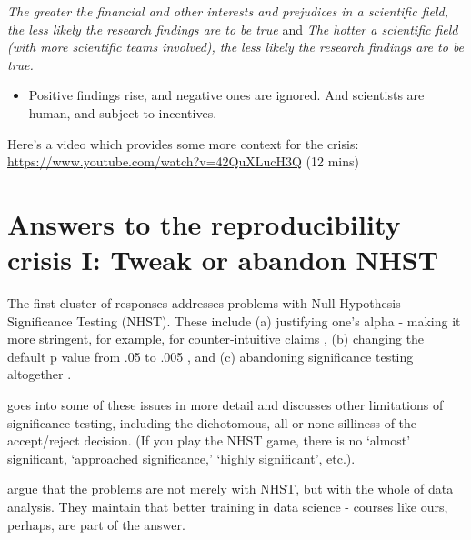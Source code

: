 \documentclass[
  openany]{book}
\providecommand{\tightlist}{%
  \setlength{\itemsep}{0pt}\setlength{\parskip}{0pt}}
\begin{document}
\emph{The greater the financial and other interests and prejudices in a scientific field, the less likely the research findings are to be true} and \emph{The hotter a scientific field (with more scientific teams involved), the less likely the research findings are to be true.}

\begin{itemize}
\tightlist
\item
  Positive findings rise, and negative ones are ignored. And scientists are human, and subject to incentives.
\end{itemize}

Here's a video which provides some more context for the crisis: \url{https://www.youtube.com/watch?v=42QuXLucH3Q} (12 mins)

\hypertarget{answers-to-the-reproducibility-crisis-i-tweak-or-abandon-nhst}{%
\section{Answers to the reproducibility crisis I: Tweak or abandon NHST}\label{answers-to-the-reproducibility-crisis-i-tweak-or-abandon-nhst}}

The first cluster of responses addresses problems with Null Hypothesis Significance Testing (NHST). These include (a) justifying one's alpha - making it more stringent, for example, for counter-intuitive claims \citep{grange2018justify}, (b) changing the default p value from .05 to .005 \citep{benjamin2017redefine}, and (c) abandoning significance testing altogether \citep{mcshane2017abandon}.

\citet{szucs2017null} goes into some of these issues in more detail and discusses other limitations of significance testing, including the dichotomous, all-or-none silliness of the accept/reject decision. (If you play the NHST game, there is no `almost' significant, `approached significance,' `highly significant', etc.).

\citet{leek2015statistics} argue that the problems are not merely with NHST, but with the whole of data analysis. They maintain that better training in data science - courses like ours, perhaps, are part of the answer.
\end{document}
